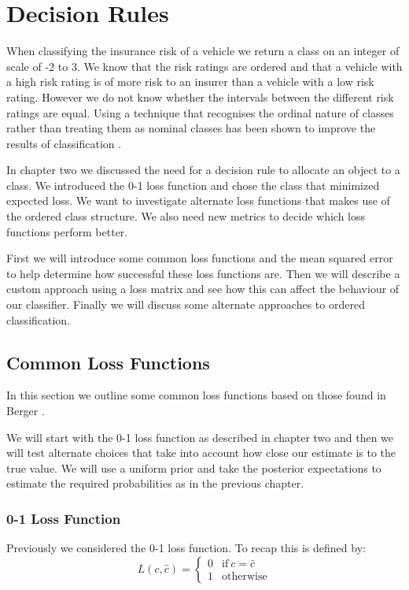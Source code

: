 \chapter{Decision Rules}

When classifying the insurance risk of a vehicle we return a class on an integer of scale of -2 to 3.
We know that the risk ratings are ordered and that a vehicle with a high risk rating is of more risk to an insurer than a vehicle with a low risk rating.
However we do not know whether the intervals between the different risk ratings are equal.
Using a technique that recognises the ordinal nature of classes rather than treating them as nominal classes has been shown to improve the results of classification \cite{Agresti10}.

In chapter two we discussed the need for a decision rule to allocate an object to a class.
We introduced the 0-1 loss function and chose the class that minimized expected loss.
We want to investigate alternate loss functions that makes use of the ordered class structure.
We also need new metrics to decide which loss functions perform better.

First we will introduce some common loss functions and the mean squared error to help determine how successful these loss functions are.
Then we will describe a custom approach using a loss matrix and see how this can affect the behaviour of our classifier.
Finally we will discuss some alternate approaches to ordered classification.

\section{Common Loss Functions}

In this section we outline some common loss functions based on those found in Berger \cite{Berger85}.

We will start with the 0-1 loss function as described in chapter two and then we will test alternate choices that take into account how close our estimate is to the true value.
We will use a uniform prior and take the posterior expectations to estimate the required probabilities as in the previous chapter.

\subsection{0-1 Loss Function}
Previously we considered the 0-1 loss function.
To recap this is defined by:
\begin{equation}
	L(c, \hat{c}) = 
	\begin{cases}
		0 & \text{if}\ c = \hat{c} \\
		1 & \text{otherwise}
	\end{cases}
\end{equation}

